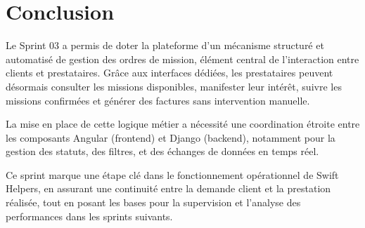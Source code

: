\section*{Conclusion}

Le Sprint 03 a permis de doter la plateforme d’un mécanisme structuré et automatisé de gestion des ordres de mission, élément central de l’interaction entre clients et prestataires. Grâce aux interfaces dédiées, les prestataires peuvent désormais consulter les missions disponibles, manifester leur intérêt, suivre les missions confirmées et générer des factures sans intervention manuelle.

La mise en place de cette logique métier a nécessité une coordination étroite entre les composants Angular (frontend) et Django (backend), notamment pour la gestion des statuts, des filtres, et des échanges de données en temps réel.

Ce sprint marque une étape clé dans le fonctionnement opérationnel de Swift Helpers, en assurant une continuité entre la demande client et la prestation réalisée, tout en posant les bases pour la supervision et l’analyse des performances dans les sprints suivants.


